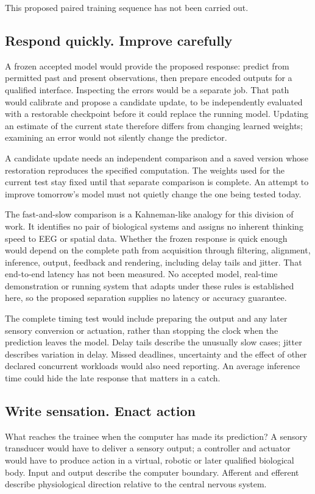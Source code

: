 This proposed paired training sequence has not been carried out.

\subsection{Respond quickly. Improve carefully}
A frozen accepted model would provide the proposed response: predict from
permitted past and present observations, then prepare encoded outputs for a
qualified interface. Inspecting the errors would be a separate job. That path
would calibrate and propose a candidate update, to be independently evaluated
with a restorable checkpoint before it could replace the running model.
Updating an estimate of the current state therefore differs from changing
learned weights; examining an error would not silently change the predictor.

A candidate update needs an independent comparison and a saved version whose restoration reproduces the specified computation. The weights used for the current test stay fixed until that separate comparison is complete. An attempt to improve tomorrow's model must not quietly change the one being tested today.

The fast-and-slow comparison is a Kahneman-like analogy for this division
of work. It identifies no pair of biological systems and assigns no inherent
thinking speed to EEG or spatial data. Whether the frozen response is quick
enough would depend on the complete path from acquisition through filtering,
alignment, inference, output, feedback and rendering, including delay tails
and jitter. That end-to-end latency has not been measured. No accepted model,
real-time demonstration or running system that adapts under these rules is
established here, so the proposed separation supplies no latency or accuracy
guarantee.

The complete timing test would include preparing the output and any later
sensory conversion or actuation, rather than stopping the clock when the
prediction leaves the model. Delay tails describe the unusually slow cases;
jitter describes variation in delay. Missed deadlines, uncertainty and the
effect of other declared concurrent workloads would also need reporting. An average
inference time could hide the late response that matters in a catch.

\subsection{Write sensation. Enact action}
What reaches the trainee when the computer has made its prediction? A sensory
transducer would have to deliver a sensory output; a controller and actuator
would have to produce action in a virtual, robotic or later qualified biological
body. Input and output describe the computer boundary. Afferent and efferent
describe physiological direction relative to the central nervous system.


